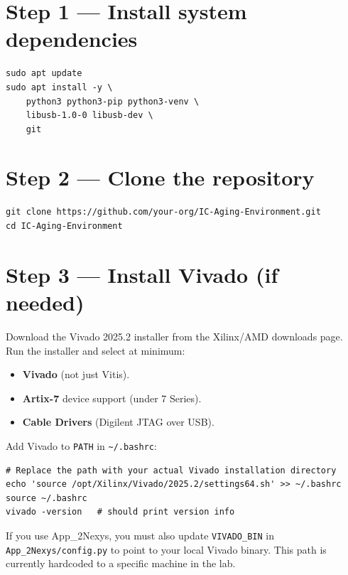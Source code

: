\documentclass[12pt, a4paper]{report}
\begin{document}
\section{Step 1 --- Install system dependencies}

\begin{lstlisting}[style=shell, caption={System package installation}]
sudo apt update
sudo apt install -y \
    python3 python3-pip python3-venv \
    libusb-1.0-0 libusb-dev \
    git
\end{lstlisting}

\section{Step 2 --- Clone the repository}

\begin{lstlisting}[style=shell]
git clone https://github.com/your-org/IC-Aging-Environment.git
cd IC-Aging-Environment
\end{lstlisting}

\section{Step 3 --- Install Vivado (if needed)}

Download the Vivado 2025.2 installer from the Xilinx/AMD downloads page.
Run the installer and select at minimum:

\begin{itemize}
  \item \textbf{Vivado} (not just Vitis).
  \item \textbf{Artix-7} device support (under 7 Series).
  \item \textbf{Cable Drivers} (Digilent JTAG over USB).
\end{itemize}

Add Vivado to \texttt{PATH} in \texttt{\textasciitilde/.bashrc}:

\begin{lstlisting}[style=shell]
# Replace the path with your actual Vivado installation directory
echo 'source /opt/Xilinx/Vivado/2025.2/settings64.sh' >> ~/.bashrc
source ~/.bashrc
vivado -version   # should print version info
\end{lstlisting}

\begin{infobox}
If you use App\_2Nexys, you must also update \texttt{VIVADO\_BIN} in
\texttt{App\_2Nexys/config.py} to point to your local Vivado binary. This path
is currently hardcoded to a specific machine in the lab.
\end{infobox}
\end{document}
